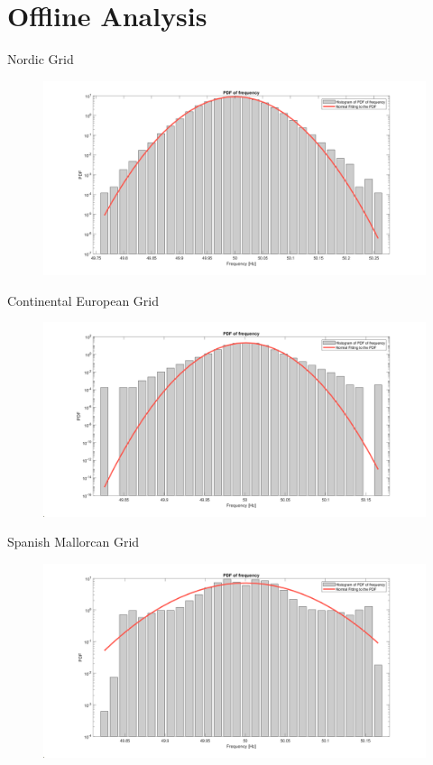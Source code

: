 \section[Offline Analysis]{Offline Analysis}
\label{sec:offline}

\begin{frame}{Nordic Grid}
	\begin{figure}
		\includegraphics[scale=0.18]{../figures/em01.png}
	\end{figure}
\end{frame}

\begin{frame}{Continental European Grid}
	\begin{figure}
		\includegraphics[scale=0.18]{../figures/em02.png}
	\end{figure}
\end{frame}

\begin{frame}{Spanish Mallorcan Grid}
	\begin{figure}
		\includegraphics[scale=0.18]{../figures/em03.png}
	\end{figure}
\end{frame}

